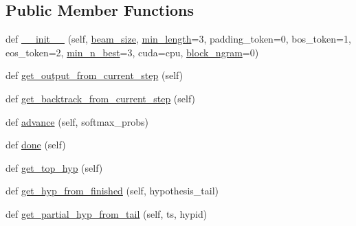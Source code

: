 \subsection*{Public Member Functions}
\begin{DoxyCompactItemize}
\item 
def \hyperlink{classparlai_1_1agents_1_1legacy__agents_1_1seq2seq_1_1torch__agent__v1_1_1Beam_af0f9f1c8fc21c9a00932129c2239b6a9}{\+\_\+\+\_\+init\+\_\+\+\_\+} (self, \hyperlink{classparlai_1_1agents_1_1legacy__agents_1_1seq2seq_1_1torch__agent__v1_1_1Beam_a3e3407eeb8dd25ede9950524146f9403}{beam\+\_\+size}, \hyperlink{classparlai_1_1agents_1_1legacy__agents_1_1seq2seq_1_1torch__agent__v1_1_1Beam_a9c3bd0baa9376a027dabbbe43c6aac5e}{min\+\_\+length}=3, padding\+\_\+token=0, bos\+\_\+token=1, eos\+\_\+token=2, \hyperlink{classparlai_1_1agents_1_1legacy__agents_1_1seq2seq_1_1torch__agent__v1_1_1Beam_a65b34839f24c68fa76df61cff22e177e}{min\+\_\+n\+\_\+best}=3, cuda=\textquotesingle{}cpu\textquotesingle{}, \hyperlink{classparlai_1_1agents_1_1legacy__agents_1_1seq2seq_1_1torch__agent__v1_1_1Beam_aa2ba93350ee7aa9ab2ae5ba01c1c0c1e}{block\+\_\+ngram}=0)
\item 
def \hyperlink{classparlai_1_1agents_1_1legacy__agents_1_1seq2seq_1_1torch__agent__v1_1_1Beam_a4f7299716e2ca82b0f8759ea11fec60a}{get\+\_\+output\+\_\+from\+\_\+current\+\_\+step} (self)
\item 
def \hyperlink{classparlai_1_1agents_1_1legacy__agents_1_1seq2seq_1_1torch__agent__v1_1_1Beam_ab714337648fc40cffa481985b382fcc4}{get\+\_\+backtrack\+\_\+from\+\_\+current\+\_\+step} (self)
\item 
def \hyperlink{classparlai_1_1agents_1_1legacy__agents_1_1seq2seq_1_1torch__agent__v1_1_1Beam_a6c6cf89b73830b99bba0420c720c50d8}{advance} (self, softmax\+\_\+probs)
\item 
def \hyperlink{classparlai_1_1agents_1_1legacy__agents_1_1seq2seq_1_1torch__agent__v1_1_1Beam_a8b62a64897663062c4e3cf9cf85fce50}{done} (self)
\item 
def \hyperlink{classparlai_1_1agents_1_1legacy__agents_1_1seq2seq_1_1torch__agent__v1_1_1Beam_abd7ea96a6f890297fc526e31e143a018}{get\+\_\+top\+\_\+hyp} (self)
\item 
def \hyperlink{classparlai_1_1agents_1_1legacy__agents_1_1seq2seq_1_1torch__agent__v1_1_1Beam_a5ae82a3d567dd8f282678d0ee40aa41e}{get\+\_\+hyp\+\_\+from\+\_\+finished} (self, hypothesis\+\_\+tail)
\item 
def \hyperlink{classparlai_1_1agents_1_1legacy__agents_1_1seq2seq_1_1torch__agent__v1_1_1Beam_a94a3638f18c959a5a9223061ea9af77e}{get\+\_\+partial\+\_\+hyp\+\_\+from\+\_\+tail} (self, ts, hypid)

\end{DoxyCompactItemize}
